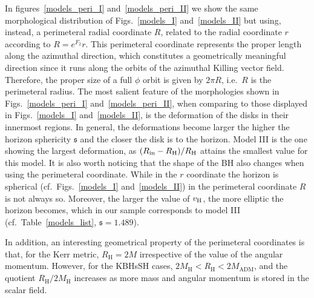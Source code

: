 \documentclass[twocolumn,aps,showpacs,showkeys,prd,superscriptaddress,byrevtex, amsmath]{revtex4-1}
\begin{document}
In figures~\ref{models_peri_I} and~\ref{models_peri_II} we show the same morphological distribution of Figs.~\ref{models_I} and~\ref{models_II} but using, instead, a perimeteral radial coordinate $R$, related to the radial coordinate $r$ according to $R = e^{F_2} r$. This perimeteral coordinate represents the proper length along the azimuthal direction, which constitutes a geometrically meaningful direction since it runs along the orbits of the azimuthal Killing vector field. Therefore, the proper size of a full $\phi$ orbit is given by $2\pi R$, i.e.~$R$ is the perimeteral radius. The most salient feature of the morphologies shown in Figs.~\ref{models_peri_I} and~\ref{models_peri_II}, when comparing to those displayed in Figs.~\ref{models_I} and~\ref{models_II}, is the deformation of the disks in their innermost regions. In general, the deformations become larger the higher the horizon sphericity $\mathfrak{s}$ and the closer the disk is to the horizon. Model III is the one showing the largest deformation, as $(R_{\rm in}-R_{\rm H})/R_{\rm H}$ attains the smallest value for this model. It is also worth noticing that the shape of the BH also changes when using the perimeteral coordinate. While in the $r$ coordinate the horizon is spherical (cf.~Figs.~\ref{models_I} and~\ref{models_II}) in the perimeteral coordinate $R$ is not always so. Moreover, the larger the value of $v_{\rm H}$, the more elliptic the horizon becomes, which in our sample corresponds to model III (cf.~Table~\ref{models_list}, $\mathfrak{s}=1.489$). 

In addition, an interesting geometrical property of the perimeteral coordinates is that, for the Kerr metric, $R_{\mathrm{H}} = 2M$ irrespective of the value of the angular momentum. However, for the KBHsSH cases, $2M_{\mathrm{H}} < R_{\mathrm{H}} < 2M_{\mathrm{ADM}}$, and the quotient $R_{\mathrm{H}}/ 2M_{\mathrm{H}}$ increases as more mass and angular momentum is stored in the scalar field. 

\end{document}
